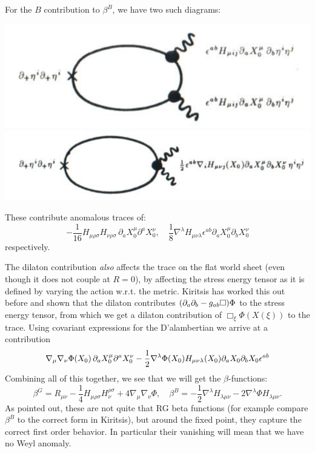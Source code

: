 \documentclass[11pt, class=article, crop=false]{standalone}
\begin{document}
\begin{enumerate}
	For the $B$ contribution to $\beta^B$, we have two such diagrams:
	\begin{center}
		\includegraphics[scale=0.6]{Figures/B1} \quad \includegraphics[scale=0.6]{Figures/B2}
	\end{center}
	These contribute anomalous traces of:
	\[
		-\frac{1}{16} H_{\mu \rho \sigma} H_{\nu \rho \sigma} \,  \partial_a X^\mu_0 \partial^a X^\nu_0, \quad \frac18 \nabla^\lambda H_{\mu \nu \lambda} \epsilon^{ab}  \partial_a X^\mu_0 \partial_b X^\nu_0
	\]
	respectively.
	
	The dilaton contribution \emph{also} affects the trace on the flat world sheet (even though it does not couple at $R=0$), by affecting the stress energy tensor as it is defined by varying the action w.r.t. the metric. Kiritsis has worked this out before and shown that the dilaton contributes $(\partial_a \partial_b - g_{ab} \Box) \Phi$ to the stress energy tensor, from which we get a dilaton contribution of $\Box_\xi \Phi(X(\xi))$ to the trace. Using covariant expressions for the D'alambertian we arrive at a contribution
	\[
		\nabla_\mu \nabla_\nu \Phi(X_0) \, \partial_a X_0^\mu \partial^a X_0^\nu - \frac12 \nabla^\lambda \Phi(X_0) H_{\mu \nu \lambda} (X_0) \partial_a X_0 \partial_b X_0 \epsilon^{ab}
	\]
	Combining all of this together, we see that we will get the $\beta$-functions:
	\[
		\beta^G = R_{\mu \nu} - \frac14 H_{\mu \rho \sigma} H_{\nu}^{\rho \sigma} + 4 \nabla_\mu \nabla_\nu \Phi, \quad \beta^B = - \frac12 \nabla^\lambda H_{\lambda \mu \nu} - 2 \nabla^\lambda \Phi H_{\lambda \mu \nu}.
	\]
	As pointed out, these are not quite that RG beta functions (for example compare $\beta^B$ to the correct form in Kiritsis), but around the fixed point, they capture the correct first order behavior. In particular their vanishing will mean that we have no Weyl anomaly. 
	

\end{enumerate}
\end{document}
